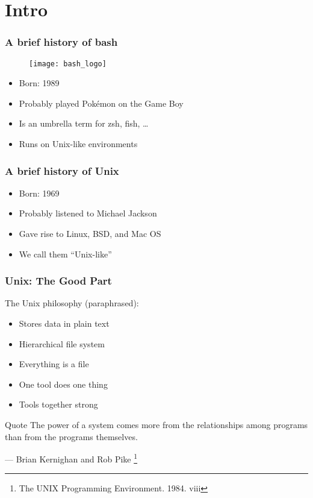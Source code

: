 \section{Intro}
\begin{frame}
\frametitle{A brief history of bash}
\begin{figure}[h]
    \centering
    \texttt{[image: bash\_logo]}
\end{figure}
\begin{itemize}
    \item Born: 1989
    \item Probably played Pokémon on the Game Boy
    \item Is an umbrella term for zsh, fish, …
    \item Runs on Unix-like environments
\end{itemize}
\end{frame}

\begin{frame}
\frametitle{A brief history of Unix}
\begin{itemize}
    \item Born: 1969
    \item Probably listened to Michael Jackson
    \item Gave rise to Linux, BSD, and Mac OS
    \item We call them ``Unix-like''
\end{itemize}
\end{frame}

\begin{frame}
\frametitle{Unix: The Good Part}
The Unix philosophy (paraphrased):
\begin{itemize}
    \item Stores data in plain text
    \item Hierarchical file system
    \item Everything is a file
    \item One tool does one thing
    \item Tools together strong
\end{itemize}
\begin{block}{Quote}
The power of a system comes more from the relationships among programs than
from the programs themselves.
\begin{flushright}
    — Brian Kernighan and Rob Pike
    \footnote{The UNIX Programming Environment. 1984. viii}
\end{flushright}
\end{block}
\end{frame}


